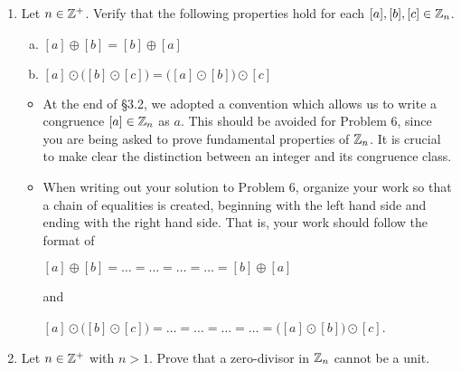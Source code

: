 \documentclass[11pt,fleqn,dvipsnames,usenames]{article}
\begin{document}
\begin{enumerate}
\item Let $n\in\mathbb{Z}^{+}$.  Verify that the following properties hold for each $[a],[b],[c]\in\mathbb{Z}_n$.
\vsmsp

\begin{enumerate}[(a)]
\item $[a] \oplus [b] = [b]\oplus [a]$
\item $[a] \odot \big([b] \odot [c]\big) = \big([a] \odot [b]\big)\odot [c]$
\end{enumerate}

\notes
\begin{itemize}
\item At the end of \S3.2, we adopted a convention which allows us to write a congruence $[a]\in\mathbb{Z}_n$ as $a$.  This should be avoided for Problem 6, since you are being asked to prove fundamental properties of $\mathbb{Z}_n$.  It is crucial to make clear the distinction between an integer and its congruence class.
\item When writing out your solution to Problem 6, organize your work so that a chain of equalities is created, beginning with the left hand side and ending with the right hand side.  That is, your work should follow the format of
\begin{center}
$[a]\oplus [b] = \ldots = \ldots = \ldots = \ldots = [b] \oplus [a]$
\end{center}
and
\begin{center}
$[a] \odot \big([b] \odot [c]\big) = \ldots = \ldots = \ldots = \ldots = \big([a] \odot [b]\big)\odot [c]$.
\end{center}
\end{itemize}
\item Let $n\in\mathbb{Z}^+$ with $n > 1$.  Prove that a zero-divisor in $\mathbb{Z}_n$ cannot be a unit.

\end{enumerate}
\end{document}
